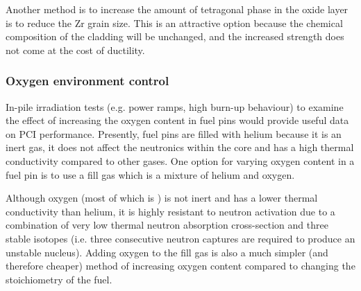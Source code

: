 Another method is to increase the amount of tetragonal phase in the oxide layer is to reduce the Zr grain size. This is an attractive option because the chemical composition of the cladding will be unchanged, and the increased strength does not come at the cost of ductility. 

\subsubsection{Oxygen environment control}

In-pile irradiation tests (e.g. power ramps, high burn-up behaviour) to examine the effect of increasing the oxygen content in fuel pins would provide useful data on PCI performance. Presently, fuel pins are filled with helium because it is an inert gas, it does not affect the neutronics within the core and has a high thermal conductivity compared to other gases. One option for varying oxygen content in a fuel pin is to use a fill gas which is a mixture of helium and oxygen. 

Although oxygen (most of which is ) is not inert and has a lower thermal conductivity than helium, it is highly resistant to neutron activation due to a combination of very low thermal neutron absorption cross-section and three stable isotopes (i.e. three consecutive neutron captures are required to produce an unstable  nucleus). Adding oxygen to the fill gas is also a much simpler (and therefore cheaper) method of increasing oxygen content compared to changing the stoichiometry of the fuel.

